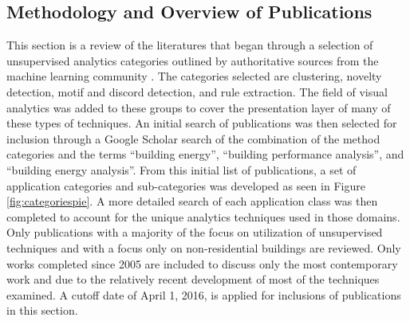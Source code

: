 \subsection{Methodology and Overview of Publications}
\label{overviewofpubs}

This section is a review of the literatures that began through a selection of unsupervised analytics categories outlined by authoritative sources from the machine learning community \citep{hastie_elements_2009,james_introduction_2013,duda_pattern_2012,mirkin_clustering:_2012}. The categories selected are clustering, novelty detection, motif and discord detection, and rule extraction. The field of visual analytics was added to these groups to cover the presentation layer of many of these types of techniques. An initial search of publications was then selected for inclusion through a Google Scholar search of the combination of the method categories and the terms ``building energy'', ``building performance analysis'', and ``building energy analysis''. From this initial list of publications, a set of application categories and sub-categories was developed as seen in Figure \ref{fig:categoriespie}. A more detailed search of each application class was then completed to account for the unique analytics techniques used in those domains. Only publications with a majority of the focus on utilization of unsupervised techniques and with a focus only on non-residential buildings are reviewed. Only works completed since 2005 are included to discuss only the most contemporary work and due to the relatively recent development of most of the techniques examined. A cutoff date of April 1, 2016, is applied for inclusions of publications in this section.